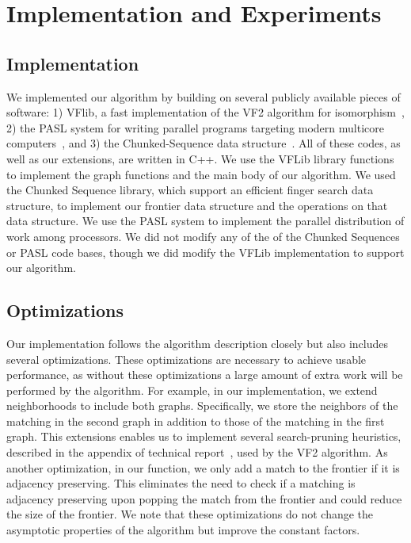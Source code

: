 %
\section{Implementation and Experiments}

\subsection{Implementation}
%
We implemented our algorithm by building on several publicly available
pieces of software: 1) VFlib, a fast implementation of the VF2
algorithm for isomorphism~\cite{VF2}, 2) the PASL system for writing
parallel programs targeting modern multicore computers~\cite{acarchra13}, and 3)
the Chunked-Sequence data structure~\cite{chunkedtreesequences}.
%
All of these codes, as well as our extensions, are written in C++.
%
We use the VFLib library functions to implement the graph functions
and the main body of our algorithm.
%
We used the
Chunked Sequence library, which
support an efficient finger search data structure, to implement our
frontier data structure and the operations on that data structure.
%
We use the PASL system to implement the parallel distribution of work
among processors.
%
We did not modify any of the of the Chunked
Sequences or PASL code bases, though we did modify the VFLib
implementation to support our algorithm.

\subsection{Optimizations}
Our implementation follows the algorithm description closely but also
includes several optimizations.
%
These optimizations are necessary to achieve usable performance,
as without these optimizations a large amount of extra work will
be performed by the algorithm.
%
For example, in our implementation, we extend neighborhoods to include
both graphs.  Specifically, we store the neighbors of the matching in
the second graph in addition to those of the matching in the first
graph.
%
This extensions enables us to implement several search-pruning
heuristics, described in the appendix of technical report~\cite{YA-iso-18}, used by the VF2
algorithm.
%
As another optimization, in our  function, we only add
a match to the frontier if it is  adjacency preserving.
%
This eliminates the need to check if a matching is adjacency
preserving upon popping the match from the frontier and could reduce
the size of the frontier.
%
We note that these optimizations do not change the asymptotic
properties of the algorithm but improve the constant factors.

